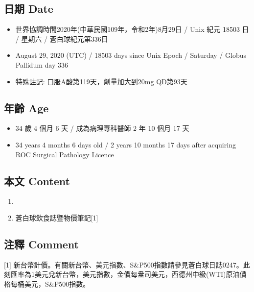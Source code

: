 \documentclass[
]{article}
\providecommand{\tightlist}{%
  \setlength{\itemsep}{0pt}\setlength{\parskip}{0pt}}
\begin{document}
\hypertarget{ux65e5ux671f-date-28}{%
\subsection{日期 Date}\label{ux65e5ux671f-date-28}}

\begin{itemize}
\tightlist
\item
  世界協調時間2020年(中華民國109年，令和2年)8月29日 / Unix 紀元 18503 日
  / 星期六 / 蒼白球紀元第336日
\item
  August 29, 2020 (UTC) / 18503 days since Unix Epoch / Saturday /
  Globus Pallidum day 336
\item
  特殊註記: 口服A酸第119天，劑量加大到20mg QD第93天
\end{itemize}

\hypertarget{ux5e74ux9f61-age-28}{%
\subsection{年齡 Age}\label{ux5e74ux9f61-age-28}}

\begin{itemize}
\tightlist
\item
  34 歲 4 個月 6 天 / 成為病理專科醫師 2 年 10 個月 17 天
\item
  34 years 4 months 6 days old / 2 years 10 months 17 days after
  acquiring ROC Surgical Pathology Licence
\end{itemize}

\hypertarget{ux672cux6587-content-28}{%
\subsection{本文 Content}\label{ux672cux6587-content-28}}

\begin{enumerate}
\def\labelenumi{\arabic{enumi}.}
\tightlist
\item
\item
  蒼白球飲食誌暨物價筆記{[}1{]}
\end{enumerate}

\hypertarget{ux6ce8ux91cb-comment-28}{%
\subsection{注釋 Comment}\label{ux6ce8ux91cb-comment-28}}

{[}1{]}
新台幣計價。有關新台幣、美元指數、S\&P500指數請參見蒼白球日誌0247。此刻匯率為1美元兌新台幣，美元指數，金價每盎司美元，西德州中級(WTI)原油價格每桶美元，S\&P500指數。
\end{document}
